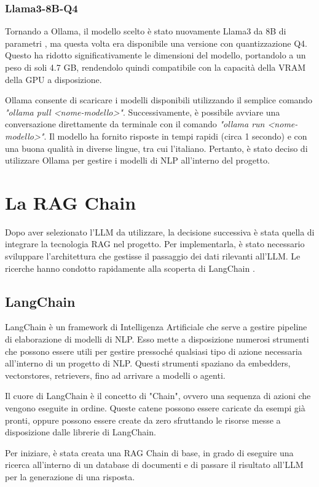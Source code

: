 \subsubsection{Llama3-8B-Q4}
Tornando a Ollama, il modello scelto è stato nuovamente Llama3 da 8B di parametri \cite{llama3ollama}, ma questa volta era disponibile una versione con quantizzazione Q4. Questo ha ridotto significativamente le dimensioni del modello, portandolo a un peso di soli 4.7 GB, rendendolo quindi compatibile con la capacità della VRAM della GPU a disposizione.

Ollama consente di scaricare i modelli disponibili utilizzando il semplice comando \textit{"ollama pull <nome-modello>"}. Successivamente, è possibile avviare una conversazione direttamente da terminale con il comando \textit{"ollama run <nome-modello>"}. Il modello ha fornito risposte in tempi rapidi (circa 1 secondo) e con una buona qualità in diverse lingue, tra cui l'italiano. Pertanto, è stato deciso di utilizzare Ollama per gestire i modelli di NLP all'interno del progetto.

\section{La RAG Chain}
Dopo aver selezionato l'LLM da utilizzare, la decisione successiva è stata quella di integrare la tecnologia RAG nel progetto. Per implementarla, è stato necessario sviluppare l'architettura che gestisse il passaggio dei dati rilevanti all'LLM. Le ricerche hanno condotto rapidamente alla scoperta di LangChain \cite{langchain}.

\subsection{LangChain}
LangChain è un framework di Intelligenza Artificiale che serve a gestire pipeline di elaborazione di modelli di NLP. Esso mette a disposizione numerosi strumenti che possono essere utili per gestire pressoché qualsiasi tipo di azione necessaria all'interno di un progetto di NLP. Questi strumenti spaziano da embedders, vectorstores, retrievers, fino ad arrivare a modelli o agenti.

Il cuore di LangChain è il concetto di "Chain", ovvero una sequenza di azioni che vengono eseguite in ordine. Queste catene possono essere caricate da esempi già pronti, oppure possono essere create da zero sfruttando le risorse messe a disposizione dalle librerie di LangChain.

Per iniziare, è stata creata una RAG Chain di base, in grado di eseguire una ricerca all'interno di un database di documenti e di passare il risultato all'LLM per la generazione di una risposta.

